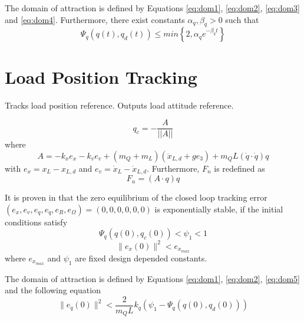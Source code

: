 The domain of attraction is defined by Equations \ref{eq:dom1}, \ref{eq:dom2}, \ref{eq:dom3} and \ref{eq:dom4}.
Furthermore, there exist constants $ \alpha_q,\beta_q>0 $ such that
\begin{equation}\label{eq:con.Psiqconv}
\Psi_q(q(t),q_d(t)) \leq min\left\lbrace 2,\alpha_qe^{-\beta_qt}\right\rbrace 
\end{equation}

\section{Load Position Tracking}\label{sec:con.loadpos}


Tracks load position reference. Outputs load attitude reference.

\begin{equation}\label{eq:con.q}
q_c = - \frac{A}{||A||}
\end{equation}
where
\begin{equation}\label{key}
A = -k_xe_x-k_ve_v+(m_Q+m_L)(\ddot{x}_{L,d}+ge_3)+m_QL(\dot{q}\cdot\dot{q})q
\end{equation}
with $ e_x=x_L-x_{L,d} $ and $ e_v=\dot{x}_L-\dot{x}_{L,d} $.
Furthermore, $ F_n $ is redefined as
\begin{equation}\label{key}
F_n=(A\cdot q)q
\end{equation}

It is proven in \cite{Sreenath2013c} that the zero equilibrium of the closed loop tracking error $ (e_x,e_v,e_q,e_{\dot{q}},e_R,e_\Omega)=(0,0,0,0,0,0) $ is exponentially stable, if the initial conditions satisfy
\begin{equation}\label{eq:dom5}
\Psi_q(q(0),q_c(0))<\psi_1<1
\end{equation}
\begin{equation}
\parallel e_{x}(0)\parallel^2<e_{x_{max}}
\end{equation}
where $ e_{x_{max}} $ and $ \psi_1 $ are fixed design depended constants. 

The domain of attraction is defined by Equations \ref{eq:dom1}, \ref{eq:dom2}, \ref{eq:dom5} and the following equation
\begin{equation}
\parallel e_{\dot{q}}(0)\parallel^2<\frac{2}{m_QL}{k_q}(\psi_1-\Psi_q(q(0),q_d(0)))
\end{equation}


